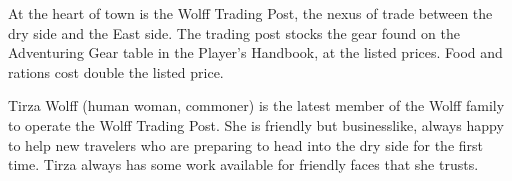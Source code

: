 At the heart of town is the Wolff Trading Post, the nexus of trade between the dry side and the East side.
The trading post stocks the gear found on the Adventuring Gear table in the Player's Handbook, at the listed prices.
Food and rations cost double the listed price.

Tirza Wolff (human woman, commoner) is the latest member of the Wolff family to operate the Wolff Trading Post.
She is friendly but businesslike, always happy to help new travelers who are preparing to head into the dry side for the first time.
Tirza always has some work available for friendly faces that she trusts.
